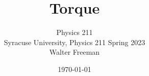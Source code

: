 \documentclass[10pt]{beamer}
\title{
  \textbf {Torque}\\
}
\author[W. Freeman] {Physics 211\\Syracuse University, Physics 211 Spring 2023\\Walter Freeman}
\date{\today}
\def\BI{\begin{itemize}}
\def\EI{\end{itemize}}
\def\BS{\bigskip}
\begin{document}
\frame{\titlepage}


%
%
%
%
%
%
%
%
%
%
%
%
%
%
%
%
%
%
%
%
%
%
%
%
%
%
%
%
%
\end{document}
